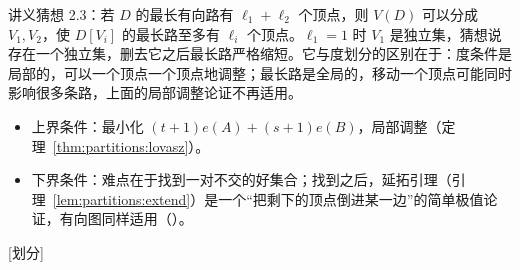 \begin{remark}[路划分猜想]
讲义猜想 2.3：若 $D$ 的最长有向路有 $\ell_1+\ell_2$ 个顶点，则 $V(D)$ 可以分成 $V_1,V_2$，使 $D[V_i]$ 的最长路至多有 $\ell_i$ 个顶点。$\ell_1=1$ 时 $V_1$ 是独立集，猜想说存在一个独立集，删去它之后最长路严格缩短。它与度划分的区别在于：度条件是局部的，可以一个顶点一个顶点地调整；最长路是全局的，移动一个顶点可能同时影响很多条路，上面的局部调整论证不再适用。
\end{remark}


\begin{itemize}
\item 上界条件：最小化 $(t+1)e(A)+(s+1)e(B)$，局部调整（定理~\ref{thm:partitions:lovasz}）。
\item 下界条件：难点在于找到一对不交的好集合；找到之后，延拓引理（引理~\ref{lem:partitions:extend}）是一个“把剩下的顶点倒进某一边”的简单极值论证，有向图同样适用（）。
\end{itemize}

[划分]


